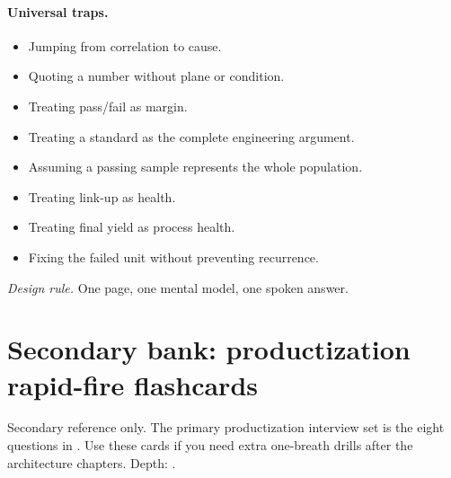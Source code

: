 \paragraph{Universal traps.}
\begin{itemize}
\item Jumping from correlation to cause.
\item Quoting a number without plane or condition.
\item Treating pass/fail as margin.
\item Treating a standard as the complete engineering argument.
\item Assuming a passing sample represents the whole population.
\item Treating link-up as health.
\item Treating final yield as process health.
\item Fixing the failed unit without preventing recurrence.
\end{itemize}

\textit{Design rule.} One page, one mental model, one spoken answer.

\clearpage
\small
\section{Secondary bank: productization rapid-fire flashcards}
\label{sec:cheat-flashcards}

Secondary reference only. The primary productization interview set is the eight
questions in . Use these cards if you need
extra one-breath drills after the architecture chapters. Depth:
.

